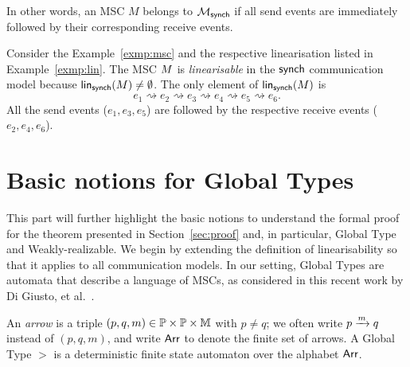 In other words, an MSC $M$ belongs to $\mscsetofmodel{\synchmodel}$ if
all send events are immediately followed by their corresponding receive events.

\bigskip

\begin{example}
Consider the Example~\ref{exmp:msc} and the respective linearisation
listed in  Example~\ref{exmp:lin}. 
The MSC $\mmsc$ is \textit{linearisable} in the $\synchmodel$ communication 
model because
$\linearisationsof{\mmsc}{\synchmodel}\neq\emptyset$.
The only element of $\linearisationsof{\mmsc}{\synchmodel}$ is
$$e_1 \rightsquigarrow e_2 \rightsquigarrow e_3 \rightsquigarrow e_4
\rightsquigarrow e_5 \rightsquigarrow e_6.$$
All the send events ($e_1, e_3, e_5$) are followed by the respective
receive events ($e_2, e_4, e_6$).
\end{example}

\section{Basic notions for Global Types}
This part will further highlight the basic notions to understand the formal proof 
for the theorem presented in Section~\ref{sec:proof} and, in particular, Global Type
and Weakly-realizable. We begin by extending the definition of linearisability so 
that it applies to all communication models.
In our setting, Global Types are automata that describe a language of MSCs, 
as considered in this recent work by Di Giusto, et al.~\cite{di2025realisability}.



\bigskip

\begin{definition}
	An \emph{arrow} is a triple $(p,q,m)\in\Procs\times\Procs\times\Messages$ 
	with $p\ne q$; we often write $\marrow{p}{q}{m}$ instead of $(p,q,m)$, and 
	write $\labelalphabet$ to denote the finite set of arrows.
	A Global Type $\gt$ is a deterministic finite state automaton over the 
	alphabet $\labelalphabet$.
\end{definition}

\bigskip


